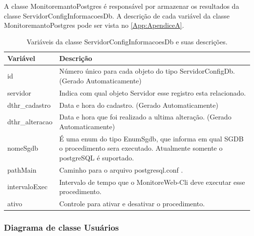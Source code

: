 A classe MonitoremantoPostgres é responsável por armazenar os resultados da classe ServidorConfigInformacoesDb. A descrição de cada variável da classe MonitoremantoPostgres pode ser vista no \autoref{App:ApendiceA}.


\begin{table}[H]
\centering
\begin{tabular}{|l|l|}
\hline
{\color[HTML]{000000} \textbf{Variável}} & {\color[HTML]{000000} \textbf{Descrição}}\\ \hline
id                                       & \multicolumn{1}{p{12.50cm}|}{Número único para cada objeto do tipo ServidorConfigDb. (Gerado Automaticamente)} \\ \hline
servidor                                 & \multicolumn{1}{p{12.50cm}|}{Indica com qual objeto Servidor esse registro esta relacionado. }\\ \hline
dthr\_cadastro                           & \multicolumn{1}{p{12.50cm}|}{Data e hora do cadastro. (Gerado Automaticamente)}\\ \hline
dthr\_alteracao                          & \multicolumn{1}{p{12.50cm}|}{Data e hora que foi realizado a ultima alteração. (Gerado Automaticamente)}\\ \hline
nomeSgdb                                 & \multicolumn{1}{p{12.50cm}|}{É uma enum do tipo EnumSgdb, que informa em qual SGDB o procedimento sera executado. Atualmente somente o postgreSQL é suportado. } \\ \hline
pathMain                                 & \multicolumn{1}{p{12.50cm}|}{Caminho para o arquivo postgresql.conf . }\\ \hline
intervaloExec                            & \multicolumn{1}{p{12.50cm}|}{Intervalo de tempo que o MonitoreWeb-Cli deve executar esse procedimento.} \\ \hline
ativo                                    & \multicolumn{1}{p{12.50cm}|}{Controle para ativar e desativar o procedimento. }\\ \hline
\end{tabular}
\caption[Variáveis da classe ServidorConfigInformacoesDb e suas descrições.]{Variáveis da classe ServidorConfigInformacoesDb e suas descrições.}
\label{Tab:VariaveisServidorConfigInformacoesDb}
\end{table}



\subsubsection{Diagrama de classe Usuários}\label{subsubsec:DiagramaClasseUsuarios}

